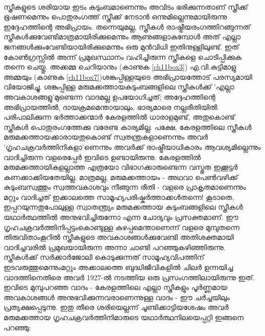 \paragraph{}
സ്ത്രീകളുടെ ശരിയായ ഇടം കുടുംബമാണെന്നും അവിടം ഭരിക്കുന്നതാണ് സ്ത്രീക്ക് ഭൂഷണമെന്നും പൊതുരംഗത്ത് സ്ത്രീക്ക് നേടാൻ ഒന്നുമില്ലെന്നുമായിരുന്നു ഇദ്ദേഹത്തിന്റെ അഭിപ്രായം. തന്നെയുമല്ല, സ്ത്രീകൾ രാഷ്ട്രീയരംഗത്തിറങ്ങുന്നത് സ്ത്രീകൾക്കുവേണ്ടിമാത്രമായിരിക്കുമെന്നും ആണുങ്ങളാകുമ്പോൾ അത് എല്ലാ ജനങ്ങൾക്കുംവേണ്ടിയായിരിക്കുമെന്നും ഒരു മുൻവിധി ഇതിനുള്ളിലുണ്ട്. ഇത് കോൺഗ്രസ്സിൽ അന്ന് പ്രമുഖസ്ഥാനം വഹിച്ചിരുന്ന സ്ത്രീകളെ ചൊടിപ്പിക്കുക തന്നെ ചെയ്തു. അക്കമ്മ ചെറിയാനും (കാണുക \ref{ch11box3})	എ.വി.കുട്ടിമാളു അമ്മയും (കാണുക \ref{ch11box7})ശങ്കുപ്പിള്ളയുടെ അഭിപ്രായത്തോട് പരസ്യമായി വിയോജിച്ചു. ശങ്കുപ്പിള്ള മരുമക്കത്തായകുടുംബങ്ങളിലെ സ്ത്രീകൾക്ക് 'എല്ലാ അവകാശങ്ങളു'മുണ്ടെന്ന വാദമല്ല ഉപയോഗിച്ചത്; അദ്ദേഹത്തിന്റെ അഭിപ്രായത്തിൽ, ദായക്രമമെന്തായാലും, ഭാര്യമാരെ നല്ലരീതിയിൽ പരിപാലിക്കുന്ന ഭർത്താക്കന്മാർ കേരളത്തിൽ ധാരാളമുണ്ട്, അതുകൊണ്ട് സ്ത്രീകൾ പൊതുരംഗത്തേക്കു വരേണ്ട കാര്യമില്ല. പക്ഷേ, കേരളത്തിലെ സ്ത്രീകൾ മരുമക്കത്തായക്കാരായതുകൊണ്ട് സ്വതന്ത്രകളാണെന്നും അവർ 'ഗൃഹചക്രവർത്തിനികളാ'ണെന്നും അവർക്ക് രാഷ്ട്രീയാധികാരം ആവശ്യമില്ലെന്നും വാദിച്ചിരുന്ന വളരെപ്പേർ ഇവിടെ ഉണ്ടായിരുന്നു. കേരളത്തിൽ മരുമക്കത്തായികളല്ലാത്ത എത്രയോ വിഭാഗക്കാരുണ്ടെന്ന വസ്തുത ഇക്കൂട്ടർ കണക്കാക്കിയതേയില്ല. മാത്രമല്ല, മരുമക്കത്തായം - അഥവാ പെൺവഴിക്ക് കുടുംബസ്വത്തും സ്വത്തവകാശവും നീങ്ങുന്ന രീതി - വളരെ പ്രാകൃതമാണെന്നും മറ്റും വാദിച്ചത് ഇക്കാലത്തെ സാമൂഹ്യപരിഷ്കർത്താക്കൾതന്നെ! കൂടാതെ, ഇപ്പറയുന്നതുപോലുള്ള സ്വാതന്ത്ര്യം മരുമക്കത്തായ കുടുംബങ്ങളിലെ സ്ത്രീകൾ യഥാർത്ഥത്തിൽ അനുഭവിച്ചിരുന്നോ എന്ന ചോദ്യവും പ്രസക്തമാണ്. ഈ ഗൃഹചക്രവർത്തിനിപ്പട്ടംകൊണ്ടുള്ള കുഴപ്പമെന്താണെന്ന് വളരെ മുമ്പുതന്നെ തിരുവിതാംകൂറിൽ സ്ത്രീകളുടെ അവകാശങ്ങൾക്കുവേണ്ടി അതിശക്തമായി വാദിച്ചവരിൽ പ്രമുഖയായിരുന്ന അന്നാ ചാണ്ടി പറഞ്ഞുകഴിഞ്ഞിരുന്നു. സ്ത്രീകൾക്ക് സർക്കാർജോലി കൊടുക്കുന്നത് സാമൂഹ്യവിപത്തിന് ഇടവരുത്തുമെന്നുംമറ്റും അക്കാലത്തെ ബുദ്ധിജീവികളിൽ ചിലർ ഉന്നയിച്ച വാദത്തിനെതിരെ അവർ 1927-ൽ നടത്തിയ ഒരു പ്രസംഗത്തിലായിരുന്നു ഇത്. ഇവിടെ മുമ്പുപറഞ്ഞ വാദം - കേരളത്തിലെ എല്ലാ സ്ത്രീകളും പൂർണ്ണമായ അവകാശങ്ങൾ അനുഭവിക്കുന്നവരാണെന്നുള്ള വാദം - ഈ ചർച്ചയിലും പ്രത്യക്ഷപ്പെടുന്നു. ഇതു തീരെ ശരിയെല്ലന്ന് ചൂണ്ടിക്കാട്ടിയശേഷം അവർ മരുമക്കത്തായ ഗൃഹചക്രവർത്തിനിമാരുടെ യഥാർത്ഥനിലയെപ്പറ്റി ഇങ്ങനെ പറഞ്ഞു:

